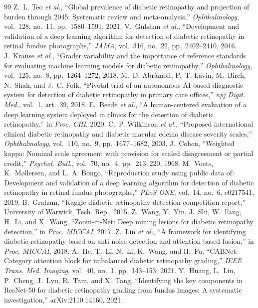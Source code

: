 \documentclass[conference,a4paper]{IEEEtran}
\begin{document}
\begin{thebibliography}{99}
\footnotesize
{} Z.~L. Teo \emph{et al.}, ``Global prevalence of diabetic retinopathy and projection of burden through 2045: Systematic review and meta-analysis,'' \emph{Ophthalmology}, vol.~128, no.~11, pp.~1580--1591, 2021.
 V.~Gulshan \emph{et al.}, ``Development and validation of a deep learning algorithm for detection of diabetic retinopathy in retinal fundus photographs,'' \emph{JAMA}, vol.~316, no.~22, pp.~2402--2410, 2016.
 J.~Krause \emph{et al.}, ``Grader variability and the importance of reference standards for evaluating machine learning models for diabetic retinopathy,'' \emph{Ophthalmology}, vol.~125, no.~8, pp.~1264--1272, 2018.
 M.~D. Abr\`amoff, P.~T. Lavin, M.~Birch, N.~Shah, and J.~C. Folk, ``Pivotal trial of an autonomous AI-based diagnostic system for detection of diabetic retinopathy in primary care offices,'' \emph{npj Digit. Med.}, vol.~1, art.~39, 2018.
 E.~Beede \emph{et al.}, ``A human-centered evaluation of a deep learning system deployed in clinics for the detection of diabetic retinopathy,'' in \emph{Proc. CHI}, 2020.
 C.~P. Wilkinson \emph{et al.}, ``Proposed international clinical diabetic retinopathy and diabetic macular edema disease severity scales,'' \emph{Ophthalmology}, vol.~110, no.~9, pp.~1677--1682, 2003.
 J.~Cohen, ``Weighted kappa: Nominal scale agreement with provision for scaled disagreement or partial credit,'' \emph{Psychol. Bull.}, vol.~70, no.~4, pp.~213--220, 1968.
 M.~Voets, K.~M{\o}llersen, and L.~A. Bongo, ``Reproduction study using public data of: Development and validation of a deep learning algorithm for detection of diabetic retinopathy in retinal fundus photographs,'' \emph{PLoS ONE}, vol.~14, no.~6, e0217541, 2019.
 B.~Graham, ``Kaggle diabetic retinopathy detection competition report,'' University of Warwick, Tech. Rep., 2015.
 Z.~Wang, Y.~Yin, J.~Shi, W.~Fang, H.~Li, and X.~Wang, ``Zoom-in-Net: Deep mining lesions for diabetic retinopathy detection,'' in \emph{Proc. MICCAI}, 2017.
 Z.~Lin \emph{et al.}, ``A framework for identifying diabetic retinopathy based on anti-noise detection and attention-based fusion,'' in \emph{Proc. MICCAI}, 2018.
 A.~He, T.~Li, N.~Li, K.~Wang, and H.~Fu, ``CABNet: Category attention block for imbalanced diabetic retinopathy grading,'' \emph{IEEE Trans. Med. Imaging}, vol.~40, no.~1, pp.~143--153, 2021.
 Y.~Huang, L.~Lin, P.~Cheng, J.~Lyu, R.~Tam, and X.~Tang, ``Identifying the key components in ResNet-50 for diabetic retinopathy grading from fundus images: A systematic investigation,'' arXiv:2110.14160, 2021.

\end{thebibliography}
\end{document}
